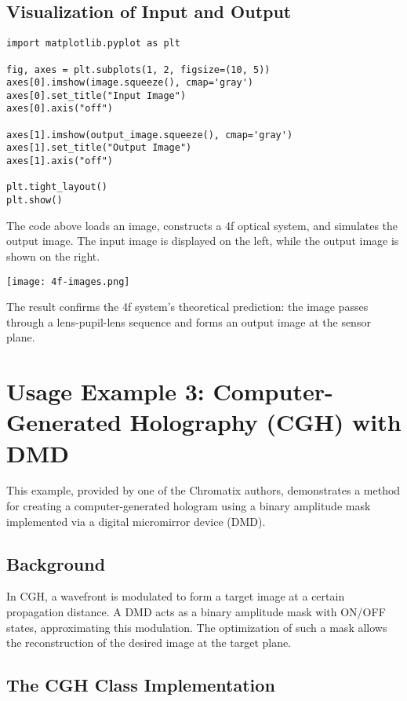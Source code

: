 \documentclass[a4paper,12pt]{report}
\begin{document}
\subsection{Visualization of Input and Output}

\begin{verbatim}
import matplotlib.pyplot as plt

fig, axes = plt.subplots(1, 2, figsize=(10, 5))
axes[0].imshow(image.squeeze(), cmap='gray')
axes[0].set_title("Input Image")
axes[0].axis("off")

axes[1].imshow(output_image.squeeze(), cmap='gray')
axes[1].set_title("Output Image")
axes[1].axis("off")

plt.tight_layout()
plt.show()
\end{verbatim}

The code above loads an image, constructs a 4f optical system, and simulates the output image. The input image is displayed on the left, while the output image is shown on the right.

\begin{center}
  \texttt{[image: 4f-images.png]}
\end{center}

The result confirms the 4f system's theoretical prediction: the image passes through a lens-pupil-lens sequence and forms an output image at the sensor plane.

\section{Usage Example 3: Computer-Generated Holography (CGH) with DMD}

This example, provided by one of the Chromatix authors, demonstrates a method for creating a computer-generated hologram using a binary amplitude mask implemented via a digital micromirror device (DMD).

\subsection{Background}

In CGH, a wavefront is modulated to form a target image at a certain propagation distance. A DMD acts as a binary amplitude mask with ON/OFF states, approximating this modulation. The optimization of such a mask allows the reconstruction of the desired image at the target plane.

\subsection{The CGH Class Implementation}
\end{document}
